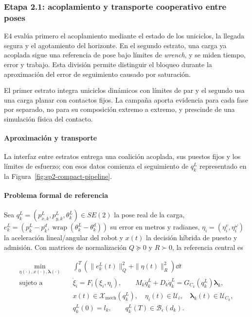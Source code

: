 \subsubsection{Etapa 2.1: acoplamiento y transporte cooperativo entre poses}
\label{subsubsec:sp2-transport}

E4 evalúa primero el acoplamiento mediante el estado de los uniciclos, la llegada segura y el agotamiento del horizonte. En el segundo estrato, una carga ya acoplada sigue una referencia de pose bajo límites de \emph{wrench}, y se miden tiempo, error y trabajo. Esta división permite distinguir el bloqueo durante la aproximación del error de seguimiento causado por saturación.

El primer estrato integra uniciclos dinámicos con límites de par y el segundo usa una carga planar con contactos fijos. La campaña aporta evidencia para cada fase por separado, no para su composición extremo a extremo, y prescinde de una simulación física del contacto.

\paragraph{Aproximación y transporte}

La interfaz entre estratos entrega una coalición acoplada, sus puestos fijos y los límites de esfuerzo; con esos datos comienza el seguimiento de $q_k^L$ representado en la Figura~\ref{fig:sp2-compact-pipeline}.


\paragraph{Problema formal de referencia}

Sea $q_k^L=(p_{x,k}^L,p_{y,k}^L,\theta_k^L)\in SE(2)$ la pose real de la carga, $e_k^L=(p_k^L-p_k^d,\operatorname{wrap}(\theta_k^L-\theta_k^d))$ su error en metros y radianes, $\eta_i=(\eta_i^v,\eta_i^\omega)$ la aceleración lineal/angular del robot y $x(t)$ la decisión híbrida de puesto y admisión. Con matrices de normalización $Q\succeq0$ y $R\succ0$, la referencia central es

\begin{equation}
\label{eq:sp4-control}
\begin{aligned}
  \min_{\eta(\cdot),x(\cdot),\boldsymbol\lambda(\cdot)}\quad
  & \int_{0}^{T}\!\left(\|e_k^L(t)\|_{Q}^{2}
    +\|\eta(t)\|_{R}^{2}\right)\dd t \\
  \text{sujeto a}\quad
  & \dot\xi_i=F_i(\xi_i,\eta_i),\qquad
    M_k\ddot q_k^L+D_k\dot q_k^L=G_{C_k}(q_k^L)\boldsymbol\lambda_k,\\
  & x(t)\in\mathcal X_{\mathrm{mech}}(q_k^L),\quad
    \eta_i(t)\in\mathcal U_i,\quad
    \boldsymbol\lambda_k(t)\in\mathcal U_{C_k},\\
  & q_k^L(0)=l_k,\qquad q_k^L(T)\in\mathcal B_{\epsilon}(d_k).
\end{aligned}
\end{equation}

